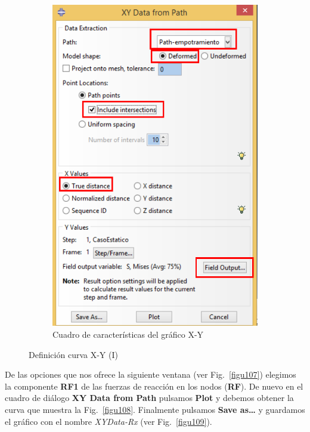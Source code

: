 \begin{enumerate}
\begin{figure}[H]
\begin{subfigure}{0.39\textwidth}
    \includegraphics[width=\textwidth]{./body/images/imagen106.pdf}
    \caption{Cuadro de características del gráfico X-Y}
    \label{figu106}
  \end{subfigure}%
  \caption{Definición curva X-Y (I)}
\end{figure}

De las opciones que nos ofrece la siguiente ventana (ver
Fig.~\ref{figu107}) elegimos la componente \textbf{RF1} de las fuerzas
de reacción en los nodos (\textbf{RF}). De nuevo en el cuadro de
diálogo \textbf{XY Data from Path} pulsamos \textbf{Plot} y debemos
obtener la curva que muestra la Fig.~\ref{figu108}. Finalmente
pulsamos \textbf{Save as\ldots} y guardamos el gráfico con el nombre
\textit{XYData-Rx} (ver Fig.~\ref{figu109}).



\end{enumerate}
